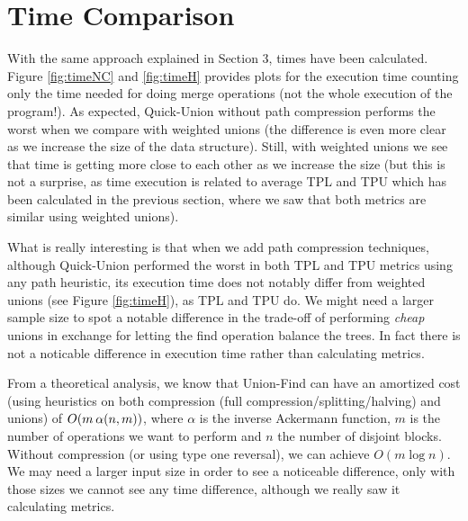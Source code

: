 \section{Time Comparison}
With the same approach explained in Section 3, times have been calculated. Figure \ref{fig:timeNC} and \ref{fig:timeH} provides plots for the execution time counting only the time needed for doing merge operations (not the whole execution of the program!). As expected, Quick-Union without path compression performs the worst when we compare with weighted unions (the difference is even more clear as we increase the size of the data structure). Still, with weighted unions we see that time is getting more close to each other as we increase the size (but this is not a surprise, as time execution is related to average TPL and TPU which has been calculated in the previous section, where we saw that both metrics are similar using weighted unions).



What is really interesting is that when we add path compression techniques, although Quick-Union performed the worst in both TPL and TPU metrics using any path heuristic, its execution time does not notably differ from weighted unions (see Figure \ref{fig:timeH}), as TPL and TPU do. We might need a larger sample size to spot a notable difference in the trade-off of performing \textit{cheap} unions in exchange for letting the find operation balance the trees. In fact there is not a noticable difference in execution time rather than calculating metrics.


From a theoretical analysis\cite{tarjan1984worst}, we know that Union-Find can have an amortized cost (using heuristics on both compression (full compression/splitting/halving) and unions) of \( O(m \hspace{2px} \alpha(n,m)) \), where \( \alpha \) is the inverse Ackermann function, $m$ is the number of operations we want to perform and $n$ the number of disjoint blocks. Without compression (or using type one reversal), we can achieve \( O(m \log n) \). We may need a larger input size in order to see a noticeable difference, only with those sizes we cannot see any time difference, although we really saw it calculating metrics.

